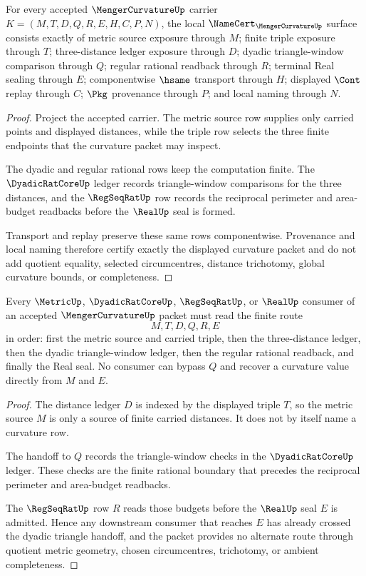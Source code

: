 \begin{theorem}
\label{thm:menger-curvature-namecert-obligations}
For every accepted $\MengerCurvatureUp$ carrier
$K=(M,T,D,Q,R,E,H,C,P,N)$, the local
$\NameCert_{\MengerCurvatureUp}$ surface consists exactly of metric source
exposure through $M$; finite triple exposure through $T$; three-distance ledger
exposure through $D$; dyadic triangle-window comparison through $Q$; regular
rational readback through $R$; terminal Real sealing through $E$;
componentwise $\hsame$ transport through $H$; displayed $\Cont$ replay through
$C$; $\Pkg$ provenance through $P$; and local naming through $N$.
\end{theorem}
\begin{proof}
Project the accepted carrier. The metric source row supplies only carried
points and displayed distances, while the triple row selects the three finite
endpoints that the curvature packet may inspect.

The dyadic and regular rational rows keep the computation finite. The
$\DyadicRatCoreUp$ ledger records triangle-window comparisons for the three
distances, and the $\RegSeqRatUp$ row records the reciprocal perimeter and
area-budget readbacks before the $\RealUp$ seal is formed.

Transport and replay preserve these same rows componentwise. Provenance and
local naming therefore certify exactly the displayed curvature packet and do
not add quotient equality, selected circumcentres, distance trichotomy, global
curvature bounds, or completeness.
\end{proof}

\begin{theorem}
\label{thm:menger-curvature-dyadic-triangle-handoff}
Every $\MetricUp$, $\DyadicRatCoreUp$, $\RegSeqRatUp$, or $\RealUp$ consumer
of an accepted $\MengerCurvatureUp$ packet must read the finite route
$$
M,T,D,Q,R,E
$$
in order: first the metric source and carried triple, then the three-distance
ledger, then the dyadic triangle-window ledger, then the regular rational
readback, and finally the Real seal. No consumer can bypass $Q$ and recover a
curvature value directly from $M$ and $E$.
\end{theorem}
\begin{proof}
The distance ledger $D$ is indexed by the displayed triple $T$, so the metric
source $M$ is only a source of finite carried distances. It does not by itself
name a curvature row.

The handoff to $Q$ records the triangle-window checks in the
$\DyadicRatCoreUp$ ledger. These checks are the finite rational boundary that
precedes the reciprocal perimeter and area-budget readbacks.

The $\RegSeqRatUp$ row $R$ reads those budgets before the $\RealUp$ seal $E$
is admitted. Hence any downstream consumer that reaches $E$ has already
crossed the dyadic triangle handoff, and the packet provides no alternate
route through quotient metric geometry, chosen circumcentres, trichotomy, or
ambient completeness.
\end{proof}

